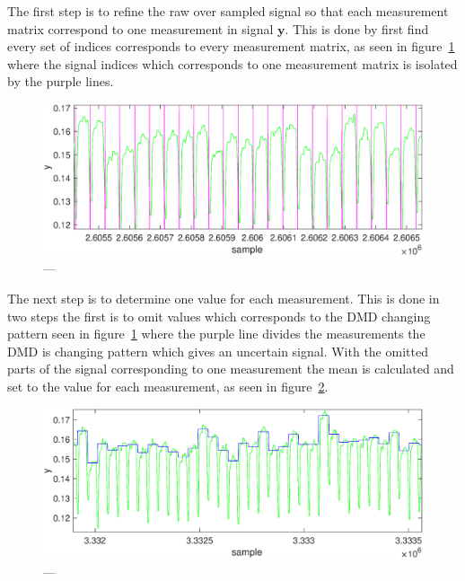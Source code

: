The first step is to refine the raw over sampled signal so that each measurement matrix correspond to one measurement in signal $\mathbf{y}$. This is done by first find every set of indices corresponds to every measurement matrix, as seen in figure~\ref{fig:raw_signal} where the signal indices which corresponds to one measurement matrix is isolated by the purple lines.


\begin{figure}[H]
\includegraphics[width = 1\linewidth]{gfx/signal_proc/isolated_raw_signal.eps}
\caption{---}
	\label{fig:raw_signal}
\end{figure}

The next step is to determine one value for each measurement. This is done in two steps the first is to omit values which corresponds to the DMD changing pattern seen in figure~\ref{fig:raw_signal} where the purple line divides the measurements the DMD is changing pattern which gives an uncertain signal. With the omitted parts of the signal corresponding to one measurement the mean is calculated and set to the value for each measurement, as seen in figure~\ref{fig:detarmain_signal}. 

\begin{figure}[H]
\includegraphics[width = 1\linewidth]{gfx/signal_proc/isolated_final_signal.eps}
\caption{---}
	\label{fig:detarmain_signal}
\end{figure}



